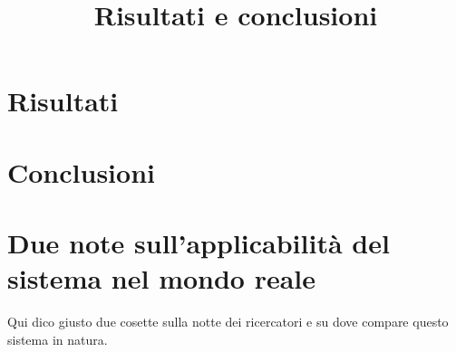 \title{Risultati e conclusioni}
\maketitle
\label{sec:conclusions}



\section{Risultati}

\section{Conclusioni}

\section{Due note sull'applicabilità del sistema nel mondo reale}
Qui dico giusto due cosette sulla notte dei ricercatori e su dove compare questo sistema in natura.